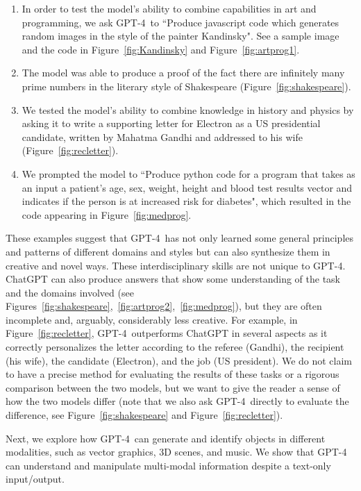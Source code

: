 \begin{enumerate}[]
\item In order to test the model's ability to combine capabilities in art and programming, we ask GPT-4\ to ``Produce javascript code which generates random images in the style of the painter Kandinsky". See a sample image and the code in Figure~\ref{fig:Kandinsky} and Figure~\ref{fig:artprog1}.
\item The model was able to produce a proof of the fact there are infinitely many prime numbers in the literary style of Shakespeare (Figure~\ref{fig:shakespeare}).
\item 
We tested the model's ability to combine knowledge in history and physics by asking it to write a supporting letter for Electron as a US presidential candidate, written by Mahatma Gandhi and addressed to his wife (Figure~\ref{fig:recletter}).
\item 
We prompted the model to ``Produce python code for a program that takes as an input a patient's age, sex, weight, height and blood test results vector and indicates if the person is at increased risk for diabetes", which resulted in the code appearing in Figure~\ref{fig:medprog}.
\end{enumerate}

These examples suggest that GPT-4\ has not only learned some general principles and patterns of different domains and styles but can also synthesize them in creative and novel ways. These interdisciplinary skills are not unique to GPT-4. ChatGPT can also produce answers that show some understanding of the task and the domains involved (see Figures~\ref{fig:shakespeare},~\ref{fig:artprog2},~\ref{fig:medprog}), but they are often incomplete and, arguably, considerably less creative. For example, in Figure~\ref{fig:recletter},  GPT-4\  outperforms ChatGPT in several aspects as it correctly personalizes the letter according to the referee (Gandhi), the recipient (his wife), the candidate (Electron), and the job (US president). We do not claim to have a precise method for evaluating the results of these tasks or a rigorous comparison between the two models, but we want to give the reader a sense of how the two models differ (note that we also ask GPT-4\ directly to evaluate the difference, see Figure~\ref{fig:shakespeare} and Figure~\ref{fig:recletter}).

\thispagestyle{empty}

\thispagestyle{empty}

Next, we explore how GPT-4\ can generate and identify objects in different modalities, such as vector graphics, 3D scenes, and music. We show that GPT-4 can understand and manipulate multi-modal information despite a text-only input/output.

